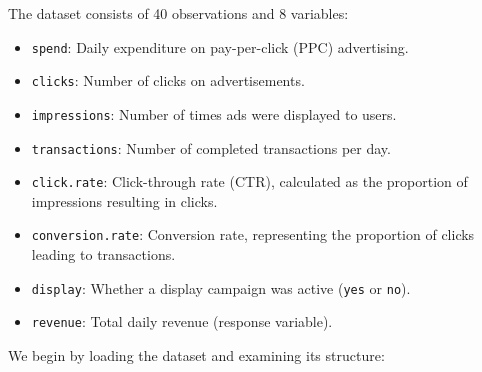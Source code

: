 \documentclass[
  11pt,
]{book}
\providecommand{\tightlist}{%
  \setlength{\itemsep}{0pt}\setlength{\parskip}{0pt}}
\theoremstyle{definition}
\theoremstyle{definition}
\theoremstyle{definition}
\theoremstyle{definition}
\theoremstyle{remark}
\begin{document}
The dataset consists of 40 observations and 8 variables:

\begin{itemize}
\tightlist
\item
  \texttt{spend}: Daily expenditure on pay-per-click (PPC) advertising.\\
\item
  \texttt{clicks}: Number of clicks on advertisements.\\
\item
  \texttt{impressions}: Number of times ads were displayed to users.\\
\item
  \texttt{transactions}: Number of completed transactions per day.\\
\item
  \texttt{click.rate}: Click-through rate (CTR), calculated as the proportion of impressions resulting in clicks.\\
\item
  \texttt{conversion.rate}: Conversion rate, representing the proportion of clicks leading to transactions.\\
\item
  \texttt{display}: Whether a display campaign was active (\texttt{yes} or \texttt{no}).\\
\item
  \texttt{revenue}: Total daily revenue (response variable).
\end{itemize}

We begin by loading the dataset and examining its structure:
\end{document}
